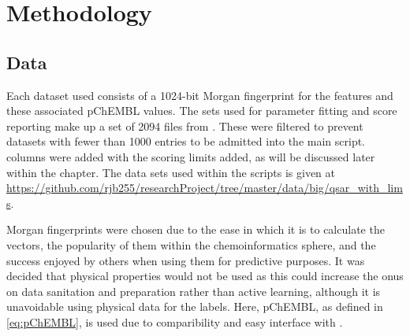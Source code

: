 \chapter{Methodology}
\label{ch:method}

\graphicspath{{Chapter3/Figs/Vector/}{Chapter3/Figs/}}

\section{Data}
Each dataset used consists of a 1024-bit Morgan fingerprint for the features and these associated pChEMBL values. The sets used for parameter fitting and score reporting make up a set of 2094 files from \textcite{CHEMBL}. These were filtered to prevent datasets with fewer than 1000 entries to be admitted into the main script. columns were added with the scoring limits added, as will be discussed later within the chapter. The data sets used within the scripts is given at \url{https://github.com/rjb255/researchProject/tree/master/data/big/qsar_with_lims}.

Morgan fingerprints were chosen due to the ease in which it is to calculate the vectors, the popularity of them within the chemoinformatics sphere, and the success enjoyed by others when using them for predictive purposes. It was decided that physical properties would not be used as this could increase the onus on data sanitation and preparation rather than active learning, although it is unavoidable using physical data for the labels. Here, pChEMBL, as defined in \ref{eq:pChEMBL}, is used due to comparibility and easy interface with \textcite{CHEMBL}.

